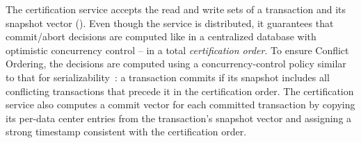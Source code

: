The certification service accepts the read and write sets of a transaction and
its snapshot vector (). Even though the
service is distributed, it guarantees that commit/abort decisions are computed
like in a centralized database with optimistic concurrency control -- in a total
{\em certification order}. To ensure Conflict Ordering,
the decisions are computed using a concurrency-control policy similar to that
for serializability~\cite{wv}: a transaction commits if its snapshot includes
all conflicting transactions that precede it in the certification order. The
certification service also computes a commit vector for each committed
transaction by copying its per-data center entries from the transaction's
snapshot vector and assigning a strong timestamp consistent with the
certification order.








